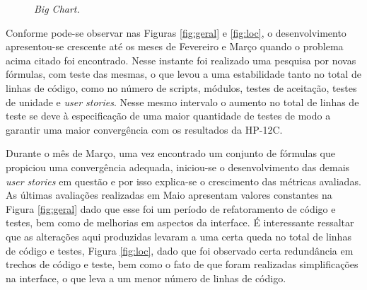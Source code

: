 \begin{figure}[!h]
 \caption{\it Big Chart.} \label{fig:bigchart}
\end{figure}

Conforme pode-se observar nas Figuras \ref{fig:geral} e \ref{fig:loc}, o desenvolvimento apresentou-se crescente até os meses de Fevereiro e Março quando o problema acima citado foi encontrado. Nesse instante foi realizado uma pesquisa por novas fórmulas, com teste das mesmas, o que levou a uma estabilidade tanto no total de linhas de código, como no número de scripts, módulos, testes de aceitação, testes de unidade e \textit{user stories}. Nesse mesmo intervalo o aumento no total de linhas de teste se deve à especificação de uma maior quantidade de testes de modo a garantir uma maior convergência com os resultados da HP-12C.

Durante o mês de Março, uma vez encontrado um conjunto de fórmulas que propiciou uma convergência adequada, iniciou-se o desenvolvimento das demais \textit{user stories} em questão e por isso explica-se o crescimento das métricas avaliadas. As últimas avaliações realizadas em Maio apresentam valores constantes na Figura \ref{fig:geral} dado que esse foi um período de refatoramento de código e testes, bem como de melhorias em aspectos da interface. É interessante ressaltar que as alterações aqui produzidas levaram a uma certa queda no total de linhas de código e testes, Figura \ref{fig:loc}, dado que foi observado certa redundância em trechos de código e teste, bem como o fato de que foram realizadas simplificações na interface, o que leva a um menor número de linhas de código.


